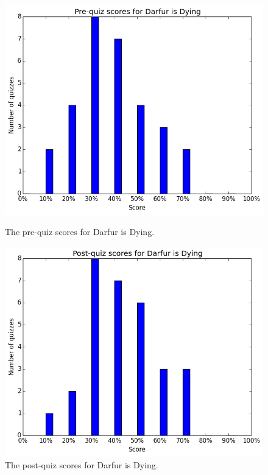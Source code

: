 			\begin{figure}[h] 
			\centering 
			\begin{minipage}[b]{0.45\linewidth}
			\includegraphics[width=\textwidth]{darfur_pre.png} 
			\caption{The pre-quiz scores for Darfur is Dying.}
			\end{minipage}
			\quad
			\begin{minipage}[b]{0.45\linewidth}
			\includegraphics[width=\textwidth]{darfur_post.png} 
			\caption{The post-quiz scores for Darfur is Dying.}
			\end{minipage}
			\end{figure}

